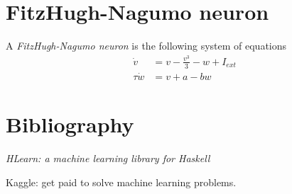 

\section{FitzHugh-Nagumo neuron}

%
%
A \emph{FitzHugh-Nagumo neuron} is the following system of equations \cite{izhikevich2006fhn}
\begin{align*}
    \dot v &= v - \frac{v^3}{3} - w + I_{ext}
    \\
    \tau \dot w &= v + a - b w
\end{align*}

\section{Bibliography}

\emph{HLearn: a machine learning library for Haskell} \cite{izbicki2013hlearn}

Kaggle: get paid to solve machine learning problems.
